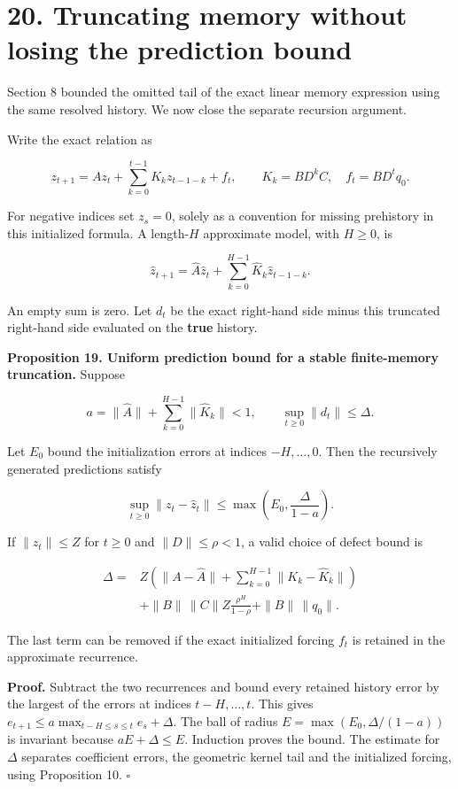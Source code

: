 \documentclass[11pt,letterpaper]{article}
\begin{document}
\section{20. Truncating memory without losing the prediction
bound}\label{truncating-memory-without-losing-the-prediction-bound}

Section 8 bounded the omitted tail of the exact linear memory expression
using the same resolved history. We now close the separate recursion
argument.

Write the exact relation as

\[
z_{t+1}=Az_t+\sum_{k=0}^{t-1}K_kz_{t-1-k}+f_t,
\qquad K_k=BD^kC,\quad f_t=BD^tq_0.
\]

For negative indices set \(z_s=0\), solely as a convention for missing
prehistory in this initialized formula. A length-\(H\) approximate
model, with \(H\geq0\), is

\[
\widehat z_{t+1}=\widehat A\widehat z_t+
\sum_{k=0}^{H-1}\widehat K_k\widehat z_{t-1-k}.
\]

An empty sum is zero. Let \(d_t\) be the exact right-hand side minus
this truncated right-hand side evaluated on the \textbf{true} history.

\textbf{Proposition 19. Uniform prediction bound for a stable
finite-memory truncation.} Suppose

\[
a=\|\widehat A\|+\sum_{k=0}^{H-1}\|\widehat K_k\|<1,
\qquad\sup_{t\geq0}\|d_t\|\leq\Delta.
\]

Let \(E_0\) bound the initialization errors at indices \(-H,\ldots,0\).
Then the recursively generated predictions satisfy

\[
\boxed{
\sup_{t\geq0}\|z_t-\widehat z_t\|
\leq\max\left(E_0,\frac{\Delta}{1-a}\right).
}
\]

If \(\|z_t\|\leq Z\) for \(t\geq0\) and \(\|D\|\leq\rho<1\), a valid
choice of defect bound is

\[
\begin{aligned}
\Delta={}&Z\left(\|A-\widehat A\|
+\sum_{k=0}^{H-1}\|K_k-\widehat K_k\|\right)\\
&+\|B\|\,\|C\|Z\frac{\rho^H}{1-\rho}
+\|B\|\,\|q_0\|.
\end{aligned}
\]

The last term can be removed if the exact initialized forcing \(f_t\) is
retained in the approximate recurrence.

\textbf{Proof.} Subtract the two recurrences and bound every retained
history error by the largest of the errors at indices \(t-H,\ldots,t\).
This gives \(e_{t+1}\leq a\max_{t-H\leq s\leq t}e_s+\Delta\). The ball
of radius \(E=\max(E_0,\Delta/(1-a))\) is invariant because
\(aE+\Delta\leq E\). Induction proves the bound. The estimate for
\(\Delta\) separates coefficient errors, the geometric kernel tail and
the initialized forcing, using Proposition 10. \(\square\)
\end{document}
